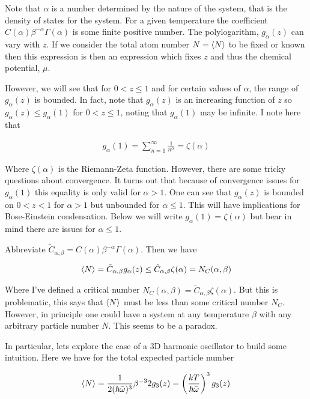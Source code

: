 \documentclass[12pt]{article}
\begin{document}
Note that $\alpha$ is a number determined by the nature of the system, that is the density of states for the system. For a given temperature the coefficient $C(\alpha)\beta^{-\alpha}\Gamma(\alpha)$ is some finite positive number. The polylogarithm, $g_{\alpha}(z)$ can vary with $z$. If we consider the total atom number $N=\braket{N}$ to be fixed or known then this expression is then an expression  which fixes $z$ and thus the chemical potential, $\mu$.

However, we will see that for $0<z \le 1$ and for certain values of $\alpha$, the range of $g_{\alpha}(z)$ is bounded. In fact, note that $g_{\alpha}(z)$ is an increasing function of $z$ so $g_{\alpha}(z) \le g_{\alpha}(1)$ for $0<z\le 1$, noting that $g_{\alpha}(1)$ may be infinite. I note here that

\begin{align}
g_{\alpha}(1) = \sum_{n=1}^{\infty} \frac{1}{n^{\alpha}} = \zeta(\alpha)
\end{align}

Where $\zeta(\alpha)$ is the Riemann-Zeta function. However, there are some tricky questions about convergence. It turns out that because of convergence issues for $g_{\alpha}(1)$ this equality is only valid for $\alpha > 1$. One can see that $g_{\alpha}(z)$ is bounded on $0<z<1$ for $\alpha >1$ but unbounded for $\alpha \le 1$. This will have implications for Bose-Einstein condensation. Below we will write $g_{\alpha}(1) = \zeta(\alpha)$ but bear in mind there are issues for $\alpha \le 1$.


Abbreviate $\tilde{C}_{\alpha,\beta} = C(\alpha)\beta^{-\alpha}\Gamma(\alpha)$. Then we have

\begin{align}
\Braket{N} = \tilde{C}_{\alpha,\beta}g_{\alpha}(z) \le \tilde{C}_{\alpha,\beta}\zeta(\alpha) = N_C(\alpha,\beta)
\end{align}

Where I've defined a critical number $N_C(\alpha,\beta) = \tilde{C}_{\alpha, \beta}\zeta(\alpha)$. But this is problematic, this says that $\Braket{N}$ must be less than some critical number $N_C$. However, in principle one could have a system at any temperature $\beta$ with any arbitrary particle number $N$. This seems to be a paradox. 

In particular, lets explore the case of a 3D harmonic oscillator to build some intuition. Here we have for the total expected particle number

\begin{align}
\braket{N} = \frac{1}{2(\hbar \bar{\omega})^3}\beta^{-3} 2 g_{3}(z) = \left(\frac{kT}{\hbar\bar{\omega}} \right)^3 g_3(z)
\end{align}
\end{document}
